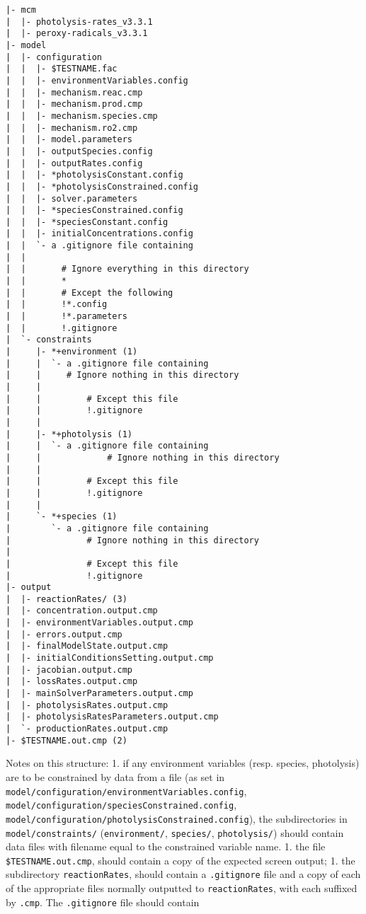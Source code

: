 \begin{verbatim}
|- mcm
|  |- photolysis-rates_v3.3.1
|  |- peroxy-radicals_v3.3.1
|- model
|  |- configuration
|  |  |- $TESTNAME.fac
|  |  |- environmentVariables.config
|  |  |- mechanism.reac.cmp
|  |  |- mechanism.prod.cmp
|  |  |- mechanism.species.cmp
|  |  |- mechanism.ro2.cmp
|  |  |- model.parameters
|  |  |- outputSpecies.config
|  |  |- outputRates.config
|  |  |- *photolysisConstant.config
|  |  |- *photolysisConstrained.config
|  |  |- solver.parameters
|  |  |- *speciesConstrained.config
|  |  |- *speciesConstant.config
|  |  |- initialConcentrations.config
|  |  `- a .gitignore file containing 
|  |
|  |       # Ignore everything in this directory
|  |       *
|  |       # Except the following
|  |       !*.config
|  |       !*.parameters
|  |       !.gitignore
|  `- constraints
|     |- *+environment (1)
|     |  `- a .gitignore file containing
|     |     # Ignore nothing in this directory
|     |
|     |         # Except this file
|     |         !.gitignore
|     |
|     |- *+photolysis (1)
|     |  `- a .gitignore file containing
|     |             # Ignore nothing in this directory
|     |
|     |         # Except this file
|     |         !.gitignore
|     |
|     `- *+species (1)
|        `- a .gitignore file containing
|               # Ignore nothing in this directory
|
|               # Except this file
|               !.gitignore
|- output
|  |- reactionRates/ (3)
|  |- concentration.output.cmp
|  |- environmentVariables.output.cmp
|  |- errors.output.cmp
|  |- finalModelState.output.cmp
|  |- initialConditionsSetting.output.cmp
|  |- jacobian.output.cmp
|  |- lossRates.output.cmp
|  |- mainSolverParameters.output.cmp
|  |- photolysisRates.output.cmp
|  |- photolysisRatesParameters.output.cmp
|  `- productionRates.output.cmp
|- $TESTNAME.out.cmp (2)
\end{verbatim}

Notes on this structure: 1. if any environment variables (resp. species,
photolysis) are to be constrained by data from a file (as set in
\texttt{model/configuration/environmentVariables.config},
\texttt{model/configuration/speciesConstrained.config},
\texttt{model/configuration/photolysisConstrained.config}), the
subdirectories in \texttt{model/constraints/} (\texttt{environment/},
\texttt{species/}, \texttt{photolysis/}) should contain data files with
filename equal to the constrained variable name. 1. the file
\texttt{\$TESTNAME.out.cmp}, should contain a copy of the expected
screen output; 1. the subdirectory \texttt{reactionRates}, should
contain a \texttt{.gitignore} file and a copy of each of the appropriate
files normally outputted to \texttt{reactionRates}, with each suffixed
by \texttt{.cmp}. The \texttt{.gitignore} file should contain

